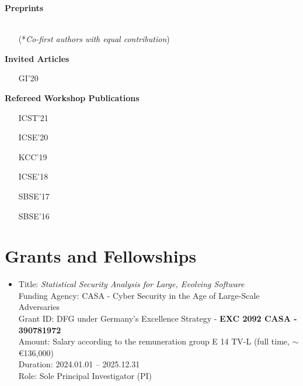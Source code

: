 \documentclass[letterpaper,11pt]{article}
\begin{document}

\textbf{Preprints}\vspace{-4pt}
\begin{itemize}[leftmargin=2cm]
  \item[] \\ (*\emph{Co-first authors with equal contribution})
  \item[] 
\end{itemize}

\textbf{Invited Articles}\vspace{-4pt}
\begin{itemize}[leftmargin=2cm]
  \item[GI'20] 
\end{itemize}

\textbf{Refereed Workshop Publications}\vspace{-4pt}
\begin{itemize}[leftmargin=2cm]
  \item[ICST'21] 
  \item[ICSE'20] 
  \item[KCC'19] 
  \item[ICSE'18] 
  \item[SBSE'17] 
  \item[SBSE'16] 
\end{itemize}

\section{Grants and Fellowships}
\begin{itemize}
  \item Title: \emph{Statistical Security Analysis for Large, Evolving Software} \\
        Funding Agency: CASA - Cyber Security in the Age of Large-Scale Adversaries \\
        Grant ID: DFG under Germany's Excellence Strategy - \textbf{EXC 2092 CASA - 390781972} \\
        Amount: Salary according to the remuneration group E 14 TV-L (full time, $\sim$ \euro{136,000}) \\
        Duration: 2024.01.01 -- 2025.12.31 \\
        Role: Sole Principal Investigator (PI)
\end{itemize}
\end{document}

